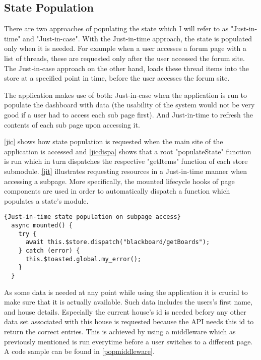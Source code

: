 \subsection{State Population}
There are two approaches of populating the state which I will refer to as "Just-in-time" and "Just-in-case". With the Just-in-time approach, the state is populated only when it is needed. For example when a user accesses a forum page with a list of threads, these are requested only after the user accessed the forum site. The Just-in-case approach on the other hand, loads these thread items into the store at a specified point in time, before the user accesses the forum site. 

The application makes use of both: Just-in-case when the application is run to populate the dashboard with data (the usability of the system would not be very good if a user had to access each sub page first). And Just-in-time to refresh the contents of each sub page upon accessing it.

\autoref{jic} shows how state population is requested when the main site of the application is accessed and \autoref{jicdispa} shows that a root "populateState" function is run which in turn dispatches the respective "getItems" function of each store submodule. \autoref{jit} illustrates requesting resources in a Just-in-time manner when accessing a subpage. More specifically, the mounted lifecycle hooks of page components are used in order to automatically dispatch a function which populates a state's module. \newline

\begin{lstlisting}[caption=Just-in-time state population on subpage access, captionpos=b, style=htmlcssjs, label=jit]{Just-in-time state population on subpage access}
  async mounted() {
    try {
      await this.$store.dispatch("blackboard/getBoards");
    } catch (error) {
      this.$toasted.global.my_error();
    }
  }
\end{lstlisting}

As some data is needed at any point while using the application it is crucial to make sure that it is actually available. Such data includes the users's first name, and house details. Especially the current house's id is needed befory any other data set associated with this house is requested because the API needs this id to return the correct entries. This is achieved by using a middleware which as previously mentioned is run everytime before a user switches to a different page. A code sample can be found in \autoref{popmiddleware}.


